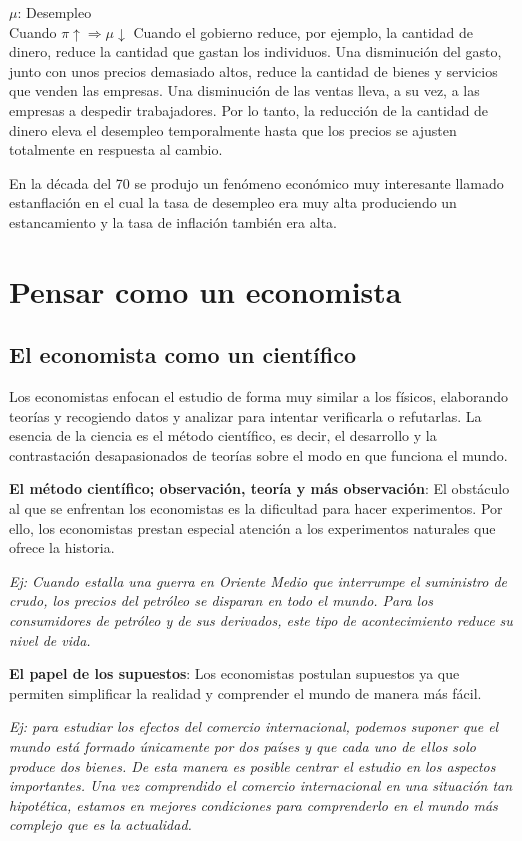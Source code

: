 \documentclass{report}
\begin{document}
$\mu$: Desempleo \\

Cuando $\pi \uparrow \Rightarrow \mu \downarrow$
Cuando el gobierno reduce, por ejemplo, la cantidad de dinero, reduce la cantidad que gastan los individuos. Una disminución del gasto, junto con unos precios demasiado altos, reduce la cantidad de bienes y servicios que venden las empresas. Una disminución de las ventas lleva, a su vez, a las empresas a despedir trabajadores. Por lo tanto, la reducción de la cantidad de dinero eleva el desempleo temporalmente hasta que los precios se ajusten totalmente en respuesta al cambio.

En la década del 70 se produjo un fenómeno económico muy interesante llamado estanflación en el cual la tasa de desempleo era muy alta produciendo un estancamiento y la tasa de inflación también era alta.

\chapter{Pensar como un economista}

\section{El economista como un científico}
Los economistas enfocan el estudio de forma muy similar a los físicos, elaborando teorías y recogiendo datos y analizar para intentar verificarla o refutarlas. La esencia de la ciencia es el método científico, es decir, el desarrollo y la contrastación desapasionados de teorías sobre el modo en que funciona el mundo.

\textbf{El método científico; observación, teoría y más observación}: El obstáculo al que se enfrentan los economistas es la dificultad para hacer experimentos. Por ello, los economistas prestan especial atención a los experimentos naturales que ofrece la historia. 

\textit{\footnotesize Ej: Cuando estalla una guerra en Oriente Medio que interrumpe el suministro de crudo, los precios del petróleo se disparan en todo el mundo. Para los consumidores de petróleo y de sus derivados, este tipo de acontecimiento reduce su nivel de vida.}

\textbf{El papel de los supuestos}: Los economistas postulan supuestos ya que permiten simplificar la realidad y comprender el mundo de manera más fácil.

\textit{\footnotesize Ej: para estudiar los efectos del comercio internacional, podemos suponer que el mundo está formado únicamente por dos países y que cada uno de ellos solo produce dos bienes. De esta manera es posible centrar el estudio en los aspectos importantes. Una vez comprendido el comercio internacional en una situación tan hipotética, estamos en mejores condiciones para comprenderlo en el mundo más complejo que es la actualidad.}
\end{document}
